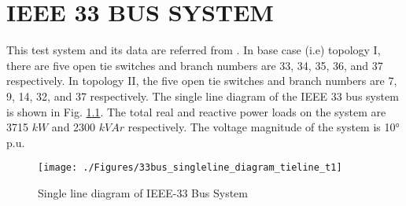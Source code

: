 \appendix
	\chapter{IEEE 33 BUS SYSTEM}
This test system and its data are referred from \cite{rao}. In base case (i.e) topology I, there are five open tie switches and branch numbers are 33, 34, 35, 36, and 37 respectively. In topology II, the five open tie switches and branch numbers are 7, 9, 14, 32, and 37 respectively.  The single line diagram of the IEEE 33 bus system is shown in Fig. \ref{fig:single33}. The total real and reactive power loads on the system are 3715 $kW$ and 2300 $kVAr$ respectively. The voltage magnitude of the system is 1\angle\ang{0} p.u.

\begin{figure}[ht]
		\texttt{[image: ./Figures/33bus\_singleline\_diagram\_tieline\_t1]}
	\caption{Single line diagram of IEEE-33 Bus System}
	\label{fig:single33}
\end{figure}

